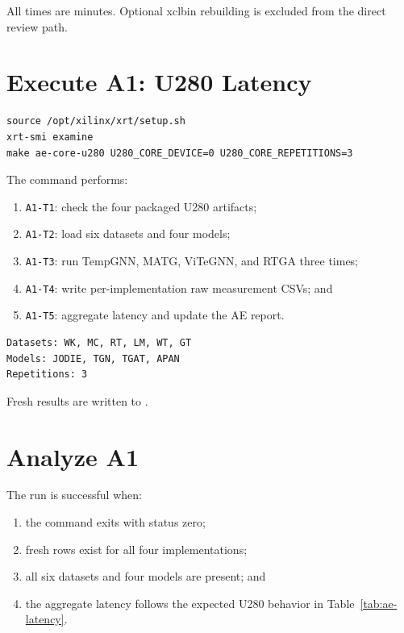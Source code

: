 \documentclass[conference]{IEEEtran}
\begin{document}
All times are minutes. Optional xclbin rebuilding is excluded from the direct
review path.

\section{Execute A1: U280 Latency}

\begin{Verbatim}[fontsize=\small,breaklines=true,breakanywhere=true]
source /opt/xilinx/xrt/setup.sh
xrt-smi examine
make ae-core-u280 U280_CORE_DEVICE=0 U280_CORE_REPETITIONS=3
\end{Verbatim}

\noindent The command performs:
\begin{enumerate}
\item \texttt{A1-T1}: check the four packaged U280 artifacts;
\item \texttt{A1-T2}: load six datasets and four models;
\item \texttt{A1-T3}: run TempGNN, MATG, ViTeGNN, and RTGA three times;
\item \texttt{A1-T4}: write per-implementation raw measurement CSVs; and
\item \texttt{A1-T5}: aggregate latency and update the AE report.
\end{enumerate}

\begin{Verbatim}[fontsize=\small,breaklines=true,breakanywhere=true]
Datasets: WK, MC, RT, LM, WT, GT
Models: JODIE, TGN, TGAT, APAN
Repetitions: 3
\end{Verbatim}

Fresh results are written to
.

\section{Analyze A1}

The run is successful when:
\begin{enumerate}
\item the command exits with status zero;
\item fresh rows exist for all four implementations;
\item all six datasets and four models are present; and
\item the aggregate latency follows the expected U280 behavior in
Table~\ref{tab:ae-latency}.
\end{enumerate}
\end{document}
